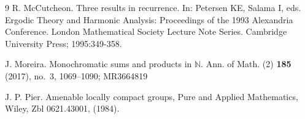 \documentclass{amsart}
\numberwithin{equation}{section}
\theoremstyle{definition}
\theoremstyle{plain}
\newcommand{\N}{{\mathbb N}}
\begin{document}
\begin{thebibliography}{9}
R. McCutcheon. Three results in recurrence. In: Petersen KE, Salama I, eds. Ergodic Theory and Harmonic Analysis: Proceedings of the 1993 Alexandria Conference. London Mathematical Society Lecture Note Series. Cambridge University Press; 1995:349-358.

 J. Moreira. Monochromatic sums and products in $\N$. Ann. of Math. (2) {\bf 185} (2017), no.~3, 1069--1090; MR3664819

J. P. Pier. Amenable locally compact groups, Pure and Applied Mathematics, Wiley, Zbl 0621.43001, (1984).

\end{thebibliography}
\end{document}
